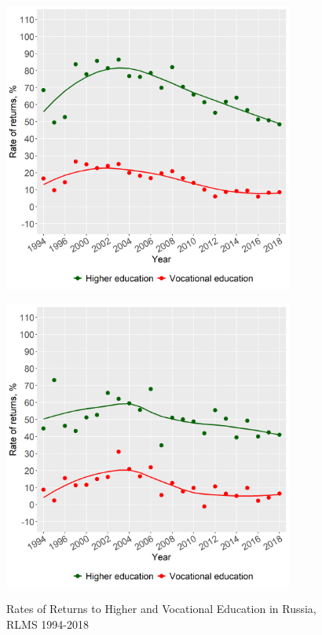 \documentclass[12pt,a4paper]{article}
\begin{document}
\begin{figure}[H]
  \begin{minipage}[b]{.5\linewidth}
     \centering
     \hspace*{-0.7in}
     \includegraphics[width=270pt]{p3a.png}
     \label{fig:3a}
  \end{minipage}
  \hfill
  \begin{minipage}[b]{.5\linewidth}
     \centering
     \hspace*{0in}
     \includegraphics[width=270pt]{p3b.png}
     \label{fig:3b}
  \end{minipage}
  \caption{Rates of Returns to Higher and Vocational Education in Russia, RLMS 1994-2018}\label{fig:4}
\end{figure}
\end{document}
